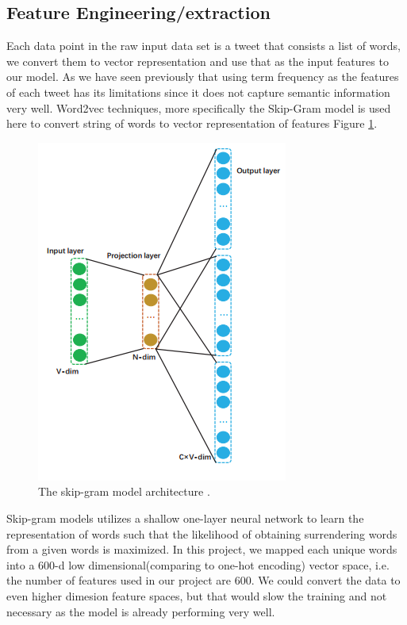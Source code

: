 \documentclass[journal, a4paper]{IEEEtran}
\begin{document}
\subsection{Feature Engineering/extraction}
Each data point in the raw input data set is a tweet that consists a list of words, we convert them to vector representation and use that as the input features to our model. As we have seen previously that using term frequency as the features of each tweet has its limitations since it does not capture semantic information very well. Word2vec techniques, more specifically the Skip-Gram model is used here to convert string of words to vector representation of features Figure \ref{fig:3}.
\begin{figure}[!hbt]
	\centering
	\includegraphics[width=0.8\columnwidth]{word2vec.png}
	\caption{ The skip-gram model architecture \cite{Li-lstm}.}
	\label{fig:3}
\end{figure}

Skip-gram models utilizes a shallow one-layer neural network to learn the representation of words such that the likelihood of obtaining surrendering words from a given words is maximized. In this project, we mapped each unique words into a 600-d low dimensional(comparing to one-hot encoding) vector space, i.e. the number of features used in our project are 600. We could convert the data to even higher dimesion feature spaces, but that would slow the training and not necessary as the model is already performing very well.
\end{document}

